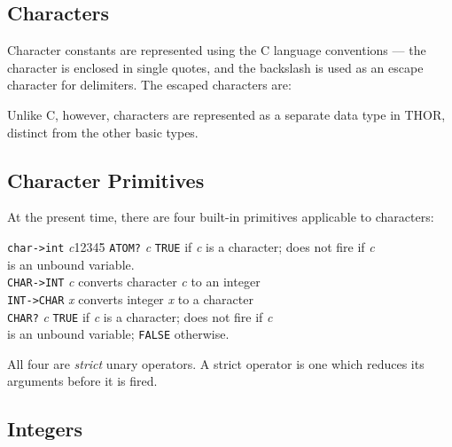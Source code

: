 \subsection{Characters}

	Character constants are represented using the C language
conventions --- the character is enclosed in single quotes, and the
backslash is used as an escape character for delimiters.  The escaped
characters are:

Unlike C,
however,	characters are represented as a separate data type in THOR, 
distinct from the other basic types.


\subsection{Character Primitives}

	At the present time, there are four built-in primitives applicable to
characters: 
\begin{tabbing}
{\tt char->int} {\sl c}12345\=\kill
{\tt ATOM?} {\sl c} \> {\tt TRUE} if {\sl c} is a character; does not fire
if {\sl c} \\ \> is an unbound variable.\\
{\tt CHAR->INT} {\sl c} \> converts character {\sl c} to an integer\\ 
{\tt INT->CHAR} {\sl x} \> converts integer {\sl x} to a character\\
{\tt CHAR?} {\sl c}     \> {\tt TRUE} if {\sl c} is a character; does not fire
if {\sl c} \\ \> is an unbound variable; {\tt FALSE} otherwise.
\end{tabbing}
All four are {\em strict} unary operators.  A strict operator is one which 
reduces its arguments before it is fired.  



\subsection{Integers}


